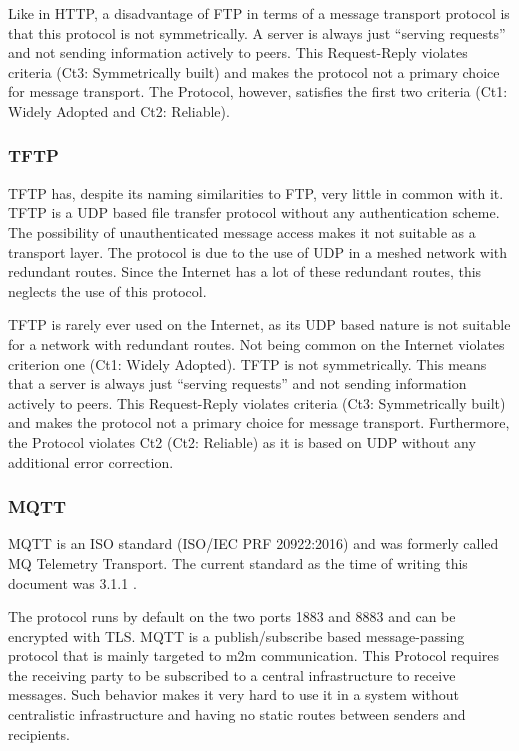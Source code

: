 Like in HTTP, a disadvantage of FTP in terms of a message transport protocol is that this protocol is not symmetrically. A server is always just ``serving requests'' and not sending information actively to peers. This Request-Reply violates criteria (Ct3: Symmetrically built) and makes the protocol not a primary choice for message transport. The Protocol, however, satisfies the first two criteria  (Ct1: Widely Adopted and Ct2: Reliable).

\subsubsection*{TFTP}
TFTP has, despite its naming similarities to FTP, very little in common with it. TFTP is a UDP based file transfer protocol without any authentication scheme. The possibility of unauthenticated message access makes it not suitable as a transport layer. The protocol is due to the use of UDP in a meshed network with redundant routes. Since the Internet has a lot of these redundant routes, this neglects the use of this protocol.

TFTP is rarely ever used on the Internet, as its UDP based nature is not suitable for a network with redundant routes. Not being common on the Internet violates criterion one (Ct1: Widely Adopted). TFTP is not symmetrically. This means that a server is always just ``serving requests'' and not sending information actively to peers. This Request-Reply violates criteria (Ct3: Symmetrically built) and makes the protocol not a primary choice for message transport. Furthermore, the Protocol violates Ct2 (Ct2: Reliable) as it is based on UDP without any additional error correction.

\subsubsection*{MQTT}
MQTT is an ISO standard (ISO/IEC PRF 20922:2016) and was formerly called MQ Telemetry Transport. The current standard as the time of writing this document was 3.1.1 \cite{mqtt}. 

The protocol runs by default on the two ports 1883 and 8883 and can be encrypted with TLS. MQTT is a publish/subscribe based message-passing protocol that is mainly targeted to m2m communication. This Protocol requires the receiving party to be subscribed to a central infrastructure to receive messages. Such behavior makes it very hard to use it in a system without centralistic infrastructure and having no static routes between senders and recipients. 

